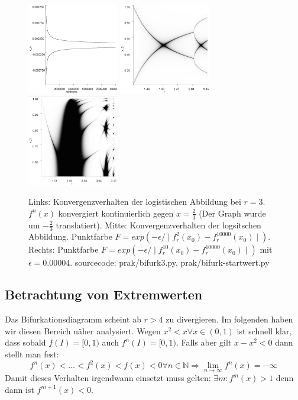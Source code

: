 \documentclass[12pt,a4paper]{article}
\begin{document}
\begin{figure}
\centering
\includegraphics[height=150px]{bifurkpunkt}
\includegraphics[height=150px]{startwert/e0008n2}
\includegraphics[height=150px]{startwert/zoomed10}
\caption{Links: Konvergenzverhalten der logistischen Abbildung bei $r=3$. $f^n(x)$ konvergiert kontinuierlich gegen $x=\frac{2}{3}$ (Der Graph wurde um $-\frac{2}{3}$ translatiert). Mitte: Konvergenzverhalten der logsitschen Abbildung. Punktfarbe $F=exp(-\epsilon / \mid f^{2}_r(x_0)-f^{10000}_r(x_0) \mid)$. Rechts: Punktfarbe $F=exp(-\epsilon / \mid f^{10}_r(x_0)-f^{10000}_r(x_0) \mid)$ mit $\epsilon=0.00004$. sourcecode: prak/bifurk3.py, prak/bifurk-startwert.py}
\label{fig:log-konv1}
\end{figure}
\subsection{Betrachtung von Extremwerten}
Das Bifurkationsdiagramm scheint ab $r>4$ zu divergieren. Im folgenden haben wir diesen Bereich näher analysiert. 
Wegen  $x^2 < x \forall x \in (0,1)$ ist schnell klar, dass sobald $f(I) = [0,1)$ auch $f^n(I) = [0, 1)$. 
Falls aber gilt $x-x^2 < 0$ dann stellt man fest:
\begin{equation}
f^n(x) < ... < f^{2}(x) < f(x) < 0 \forall n \in \mathbb{N} \Rightarrow \lim_{n \rightarrow \infty} f^n(x) = -\infty
\end{equation}
Damit dieses Verhalten irgendwann einsetzt muss gelten: $\exists m: f^m(x) > 1$ denn dann ist $f^{m+1}(x) < 0$. 
\end{document}
